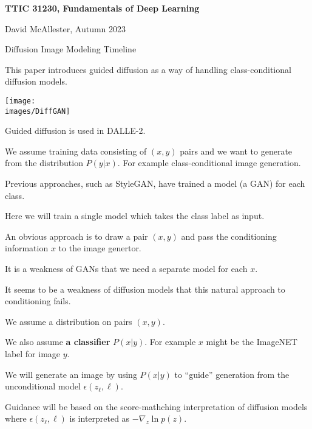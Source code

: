 





{\Huge

  \centerline{\bf TTIC 31230, Fundamentals of Deep Learning}
  \bigskip
  \centerline{David McAllester, Autumn 2023}
  \vfill
  \vfil
  \centerline{Diffusion Image Modeling Timeline}
  \vfill
  \vfill


This paper introduces guided diffusion as a way of handling class-conditional diffusion models.

\vfill
\centerline{\texttt{[image: \\images/DiffGAN]}}

\vfill
Guided diffusion is used in DALLE-2.


We assume training data consisting of $(x,y)$ pairs and we want to generate from the distribution $P(y|x)$.  For example class-conditional image generation.

\vfill
Previous approaches, such as StyleGAN, have trained a model (a GAN) for each class.

\vfill
Here we will train a single model which takes the class label as input.


An obvious approach is to draw a pair $(x,y)$ and pass the conditioning information $x$ to the image genertor.

\vfill
It is a weakness of GANs that we need a separate model for each $x$.

\vfill
It seems to be a weakness of diffusion models that this natural approach to conditioning fails.

We assume a distribution on pairs $(x,y)$.

\vfill
We also assume {\bf a classifier} $P(x|y)$.  For example $x$ might be the ImageNET label for image $y$.

\vfill
We will generate an image by using $P(x|y)$ to ``guide'' generation from the unconditional model $\epsilon(z_\ell,\ell)$.

\vfill
Guidance will be based on the score-mathching interpretation of diffusion models where
$\epsilon(z_\ell,\ell)$ is interpreted as $- \nabla_z \ln p(z)$.


}
